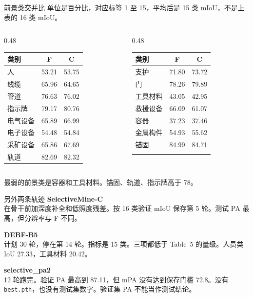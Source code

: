 \documentclass[aspectratio=169,11pt]{ctexbeamer}
\begin{document}
\begin{frame}{前景类交并比}
  \small
  单位是百分比，对应标签 1 至 15，平均后是 15 类 mIoU，不是上表的 16 类 mIoU。
  \vspace{0.3em}
  \begin{columns}[T]
    \begin{column}{0.48\textwidth}
      \begin{tabular}{lcc}
        \toprule
        类别 & F & C \\
        \midrule
        人 & 53.21 & 53.75 \\
        线缆 & 65.96 & 64.65 \\
        管道 & 76.63 & 76.02 \\
        指示牌 & 79.17 & 80.76 \\
        电气设备 & 65.89 & 66.99 \\
        电子设备 & 54.48 & 54.84 \\
        采矿设备 & 65.86 & 67.69 \\
        轨道 & 82.69 & 82.32 \\
        \bottomrule
      \end{tabular}
    \end{column}
    \begin{column}{0.48\textwidth}
      \begin{tabular}{lcc}
        \toprule
        类别 & F & C \\
        \midrule
        支护 & 71.80 & 73.72 \\
        门 & 78.26 & 79.89 \\
        工具材料 & 43.05 & 42.95 \\
        救援设备 & 66.09 & 61.07 \\
        容器 & 37.23 & 37.46 \\
        金属构件 & 54.93 & 55.62 \\
        锚固 & 84.99 & 84.71 \\
         &  &  \\
        \bottomrule
      \end{tabular}
    \end{column}
  \end{columns}
  \vspace{0.4em}
  \scriptsize 最弱的前景类是容器和工具材料。锚固、轨道、指示牌高于 78。
\end{frame}

\begin{frame}{另外两条轨迹}
  \textbf{SelectiveMine-C}\\
  在骨干前加深度补全和低照度残差。按 16 类验证 mIoU 保存第 5 轮。测试 PA 最高，但分辨率与 F 不同。

  \vspace{0.5em}
  \textbf{DEBF-B5}\\
  计划 30 轮，停在第 14 轮。指标是 15 类。三项都低于 Table~5 的量级。人员类 IoU 27.33，工具材料 20.42。

  \vspace{0.5em}
  \textbf{selective\_pa2}\\
  12 轮跑完。验证 PA 最高到 87.11，但 mPA 没有达到保存门槛 72.8。没有 \texttt{best.pth}，也没有测试集数字。验证集 PA 不能当作测试结论。
\end{frame}
\end{document}
